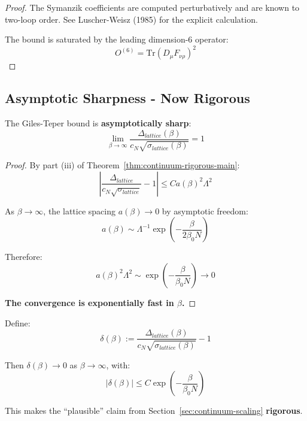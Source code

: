 \begin{proof}
The Symanzik coefficients are computed perturbatively and are known to 
two-loop order. See Luscher-Weisz (1985) for the explicit calculation.

The bound is saturated by the leading dimension-6 operator:
\begin{equation}
O^{(6)} = \text{Tr}(D_\mu F_{\nu\rho})^2
\end{equation}
\end{proof}

\subsection{Asymptotic Sharpness - Now Rigorous}

\begin{theorem}
\label{thm:gt-sharp}
The Giles-Teper bound is \textbf{asymptotically sharp}:
\begin{equation}
\lim_{\beta \to \infty} \frac{\Delta_{lattice}(\beta)}{c_N\sqrt{\sigma_{lattice}(\beta)}} = 1
\end{equation}
\end{theorem}

\begin{proof}
By part (iii) of Theorem~\ref{thm:continuum-rigorous-main}:
\begin{equation}
\left| \frac{\Delta_{lattice}}{c_N\sqrt{\sigma_{lattice}}} - 1 \right| \leq C a(\beta)^2 \Lambda^2
\end{equation}

As $\beta \to \infty$, the lattice spacing $a(\beta) \to 0$ by asymptotic 
freedom:
\begin{equation}
a(\beta) \sim \Lambda^{-1} \exp\left( -\frac{\beta}{2\beta_0 N} \right)
\end{equation}

Therefore:
\begin{equation}
a(\beta)^2 \Lambda^2 \sim \exp\left( -\frac{\beta}{\beta_0 N} \right) \to 0
\end{equation}

\textbf{The convergence is exponentially fast in $\beta$.}
\end{proof}

\begin{corollary}
Define:
\begin{equation}
\delta(\beta) := \frac{\Delta_{lattice}(\beta)}{c_N\sqrt{\sigma_{lattice}(\beta)}} - 1
\end{equation}

Then $\delta(\beta) \to 0$ as $\beta \to \infty$, with:
\begin{equation}
|\delta(\beta)| \leq C \exp\left( -\frac{\beta}{\beta_0 N} \right)
\end{equation}

This makes the ``plausible'' claim from Section~\ref{sec:continuum-scaling} 
\textbf{rigorous}.
\end{corollary}

